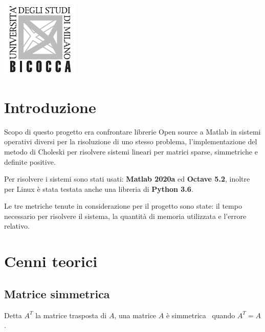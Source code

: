 \documentclass[a4paper,12pt,titlepage,oneside]{book}
\begin{document}
\begin{titlepage}

\includegraphics[scale = 2.5]{src/image/unimib-logo.pdf}\\[1cm] %
 

\vfill %

\end{titlepage}

\tableofcontents

\chapter{Introduzione}
Scopo di questo progetto era confrontare librerie Open source a Matlab in sistemi operativi diversi per la risoluzione di uno stesso problema, l'implementazione del metodo di Choleski per risolvere sistemi lineari per matrici sparse, simmetriche e definite positive.

Per risolvere i sistemi sono stati usati: \textbf{Matlab 2020a} ed \textbf{Octave 5.2}, inoltre per Linux è stata testata anche una libreria di \textbf{Python 3.6}.

Le tre metriche tenute in considerazione per il progetto sono state: il tempo necessario per risolvere il sistema, la quantità di memoria utilizzata e l'errore relativo.

    
\chapter{Cenni teorici}
\section{Matrice simmetrica}
Detta $A^T$ la matrice trasposta di $A$, una matrice $A$ è simmetrica~\cite{matsim} quando $A^T=A$.
\end{document}
